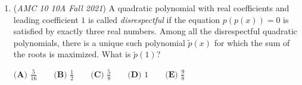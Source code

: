 \begin{enumerate}
	\item (\textit{AMC 10 10A Fall 2021}) A quadratic polynomial with real coefficients and leading coefficient $1$ is called \textit{disrespectful} if the equation $p(p(x))=0$ is satisfied by exactly three real numbers. Among all the disrespectful quadratic polynomials, there is a unique such polynomial $\tilde{p}(x)$ for which the sum of the roots is maximized. What is $\tilde{p}(1)$?


 $\textbf{(A) } \frac{5}{16} \qquad\textbf{(B) } \frac{1}{2} \qquad\textbf{(C) } \frac{5}{8} \qquad\textbf{(D) } 1 \qquad\textbf{(E) } \frac{9}{8}$


\end{enumerate}